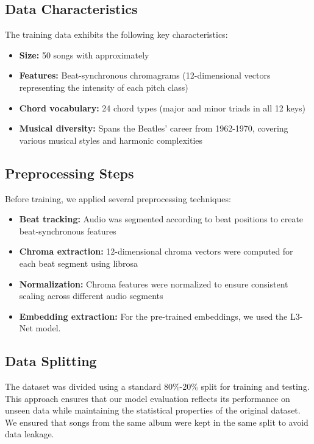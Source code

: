 \documentclass{article}
\begin{document}
\subsection{Data Characteristics}
The training data exhibits the following key characteristics:
\begin{itemize}
    \item \textbf{Size:} 50 songs with approximately 
    \item \textbf{Features:} Beat-synchronous chromagrams (12-dimensional vectors representing 
      the intensity of each pitch class)
    \item \textbf{Chord vocabulary:} 24 chord types (major and minor triads in all 12 keys)
    \item \textbf{Musical diversity:} Spans the Beatles' career from 1962-1970, covering various 
      musical styles and harmonic complexities
\end{itemize}

\subsection{Preprocessing Steps}
Before training, we applied several preprocessing techniques:
\begin{itemize}
    \item \textbf{Beat tracking:} Audio was segmented according to beat positions to create 
      beat-synchronous features
    \item \textbf{Chroma extraction:} 12-dimensional chroma vectors were computed for each beat 
      segment using librosa
    \item \textbf{Normalization:} Chroma features were normalized to ensure consistent scaling 
      across different audio segments
    \item \textbf{Embedding extraction:} For the pre-trained embeddings, we used the L3-Net model.
\end{itemize}

\subsection{Data Splitting}
The dataset was divided using a standard 80\%-20\% split for training and testing. 
This approach ensures that our model evaluation reflects its performance on unseen data while 
maintaining the statistical properties of the original dataset. We ensured that songs from the 
same album were kept in the same split to avoid data leakage.
\end{document}
